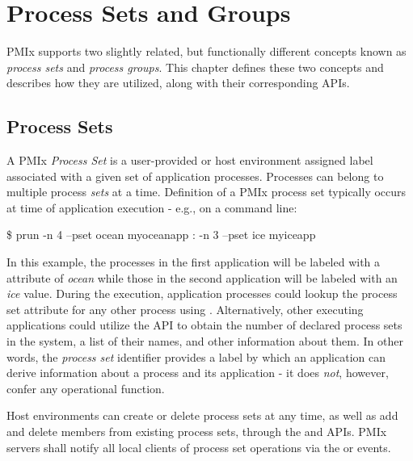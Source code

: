 \chapter{Process Sets and Groups}
\label{chap:api_sets_groups}

\ac{PMIx} supports two slightly related, but functionally different concepts
known as \emph{process sets} and \emph{process groups}. This chapter defines
these two concepts and describes how they are utilized, along with their
corresponding \acp{API}.

\section{Process Sets}
\label{chap:api_sets_groups:sets}

A \ac{PMIx} \emph{Process Set} is a user-provided or host environment assigned
label associated with a given set of application processes. Processes can
belong to multiple process \emph{sets} at a time. Definition of a \ac{PMIx}
process set typically occurs at time of application execution - e.g., on a
command line:

\cspecificstart
\begin{codepar}
\$ prun -n 4 --pset ocean myoceanapp : -n 3 --pset ice myiceapp
\end{codepar}
\cspecificend

In this example, the processes in the first application will be labeled with a  attribute of \emph{ocean} while those in the second application will be labeled with an \emph{ice} value. During the execution, application processes could lookup the process set attribute for any other process using . Alternatively, other executing applications could utilize the  \ac{API} to obtain the number of declared process sets in the system, a list of their names, and other information about them. In other words, the \emph{process set} identifier provides a label by which an application can derive information about a process and its application - it does \emph{not}, however, confer any operational function.

Host environments can create or delete process sets at any time, as well as
add and delete members from existing process sets, through the
 and
 \acp{API}. \ac{PMIx} servers shall
notify all local clients of process set operations via the
 or 
events.

